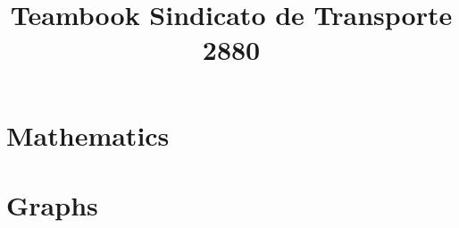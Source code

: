 \documentclass[landscape,twocolumn, 7pt, letterpaper]{book}
\begin{document}
\title{Teambook Sindicato de Transporte 2880}
\maketitle

\tableofcontents

\chapter{Mathematics}


\chapter{Graphs}

\end{document}
